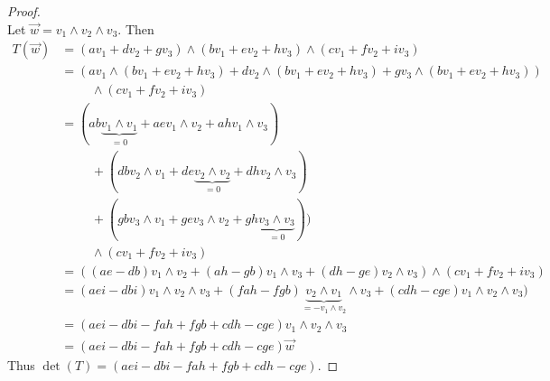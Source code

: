 \documentclass{article}
\begin{document}
\begin{proof} $ $\\
  Let $\vec{w} = v_1 \wedge v_2 \wedge v_3$. Then \begin{align*}
    T(\vec{w}) &= (av_1 + dv_2 + gv_3) \wedge (bv_1 + ev_2 + hv_3) \wedge (cv_1 + fv_2 + iv_3) \\
      &= (av_1 \wedge (bv_1 + ev_2 + hv_3) + dv_2 \wedge (bv_1 + ev_2 + hv_3) + gv_3 \wedge (bv_1 + ev_2 + hv_3)) \\
      &\hspace{1cm}\wedge (cv_1 + fv_2 + iv_3)\\
      &= (ab \underbrace{v_1 \wedge v_1}_{=0} + aev_1 \wedge v_2 + ahv_1 \wedge v_3)\\
      &\hspace{1cm}+ (dbv_2 \wedge v_1 + de\underbrace{v_2 \wedge v_2}_{=0} + dhv_2 \wedge v_3)\\
      &\hspace{1cm}+ (gbv_3 \wedge v_1 + gev_3 \wedge v_2 + gh\underbrace{v_3 \wedge v_3}_{=0})) \\
      &\hspace{1cm}\wedge (cv_1 + fv_2 + iv_3)\\
      &= ((ae-db)v_1 \wedge v_2 + (ah-gb)v_1 \wedge v_3 + (dh-ge)v_2 \wedge v_3)
        \wedge (cv_1 + fv_2 + iv_3) \\
      &= (aei-dbi)v_1 \wedge v_2 \wedge v_3 + (fah-fgb)\underbrace{v_2 \wedge v_1}_{=-v_1\wedge v_2} \wedge v_3 + (cdh-cge)v_1 \wedge v_2 \wedge v_3)\\
      &= (aei - dbi - fah + fgb + cdh - cge) v_1 \wedge v_2 \wedge v_3\\
      &= (aei - dbi - fah + fgb + cdh - cge) \vec{w}
  \end{align*}
  Thus $\det(T) = (aei - dbi - fah + fgb + cdh - cge)$.
\end{proof}

\pagebreak
\end{document}
